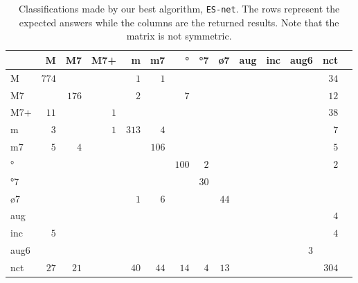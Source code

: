 \documentclass{article}
\begin{document}
\begin{table*}
\centering
\begin{tabular}{l||r|r|r|r|r|r|r|r|r|r|r|r|r}
      &     M &    M7 &   M7+ &     m &    m7 &    ° &   °7 &   ø7 &   aug &   inc &  aug6 &   nct \\  \hline \hline
    M & $ 774 $ & $     $ & $     $ & $   1 $ & $   1 $ & $     $ & $     $ & $     $ & $     $ & $     $ & $     $ & $  34 $ \\ \hline
   M7 & $     $ & $ 176 $ & $     $ & $   2 $ & $     $ & $   7 $ & $     $ & $     $ & $     $ & $     $ & $     $ & $  12 $ \\ \hline
  M7+ & $  11 $ & $     $ & $   1 $ & $     $ & $     $ & $     $ & $     $ & $     $ & $     $ & $     $ & $     $ & $  38 $ \\ \hline
    m & $   3 $ & $     $ & $   1 $ & $ 313 $ & $   4 $ & $     $ & $     $ & $     $ & $     $ & $     $ & $     $ & $   7 $ \\ \hline
   m7 & $   5 $ & $   4 $ & $     $ & $     $ & $ 106 $ & $     $ & $     $ & $     $ & $     $ & $     $ & $     $ & $   5 $ \\ \hline
   ° & $     $ & $     $ & $     $ & $     $ & $     $ & $ 100 $ & $   2 $ & $     $ & $     $ & $     $ & $     $ & $   2 $ \\ \hline
  °7 & $     $ & $     $ & $     $ & $     $ & $     $ & $     $ & $  30 $ & $     $ & $     $ & $     $ & $     $ & $     $ \\ \hline
  ø7 & $     $ & $     $ & $     $ & $   1 $ & $   6 $ & $     $ & $     $ & $  44 $ & $     $ & $     $ & $     $ & $     $ \\ \hline
  aug & $     $ & $     $ & $     $ & $     $ & $     $ & $     $ & $     $ & $     $ & $     $ & $     $ & $     $ & $   4 $ \\ \hline
  inc & $   5 $ & $     $ & $     $ & $     $ & $     $ & $     $ & $     $ & $     $ & $     $ & $     $ & $     $ & $   4 $ \\ \hline
 aug6 & $     $ & $     $ & $     $ & $     $ & $     $ & $     $ & $     $ & $     $ & $     $ & $     $ & $   3 $ & $     $ \\ \hline
  nct & $  27 $ & $  21 $ & $     $ & $  40 $ & $  44 $ & $  14 $ & $   4 $ & $  13 $ & $     $ & $     $ & $     $ & $ 304 $ \\ \hline
\end{tabular}
\caption{Classifications made by our best algorithm, \texttt{ES-net}. The rows represent
  the expected answers while the columns are the returned
  results. Note that the matrix is not symmetric.}
\label{tab:erros-es-net}
\end{table*}
\end{document}

